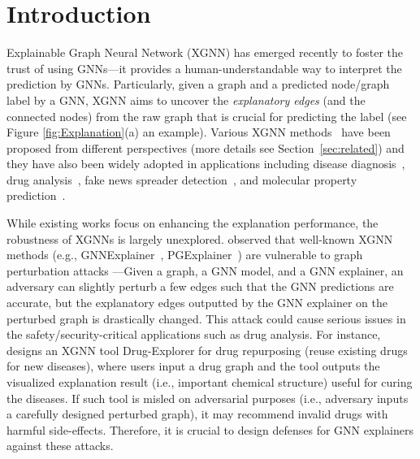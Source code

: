 \section{Introduction}
\label{sec:intro}

Explainable Graph Neural Network (XGNN) has emerged recently  to foster the trust of using GNNs---it provides a human-understandable way to interpret the prediction by GNNs. Particularly, given a graph and a predicted node/graph label by a GNN, XGNN aims to uncover the \emph{explanatory edges} (and the connected nodes) from the raw graph that is crucial for predicting the label (see Figure \ref{fig:Explanation}(a) an example). Various XGNN methods~\citep{GNNEx19,DBLP:journals/corr/abs-2011-04573/PGExplainer,DBLP:journals/corr/abs-2102-05152/subgraphX,zhang2022gstarx,wang2023/gnninterpreter,behnam2024graph} have been proposed from different perspectives (more details see Section~\ref{sec:related}) and they have also been widely adopted in applications including  disease diagnosis~\citep{pfeifer2022gnn}, drug analysis~\citep{yang2022mgraphdta,Drug_repurposing2023}, fake news spreader detection~\citep{rath2021scarlet}, and molecular property prediction~\cite{wu2023chemistry}. 
 
While existing works focus on enhancing the explanation performance, the robustness of XGNNs is largely unexplored. 
\citet{li2024graph} observed that  
 well-known XGNN methods (e.g., GNNExplainer~\citep{GNNEx19}, PGExplainer~\citep{DBLP:journals/corr/abs-2011-04573/PGExplainer}) are vulnerable to graph perturbation attacks
---Given a graph, a  GNN model, and a GNN explainer, an adversary can slightly perturb a few edges such that the GNN predictions are accurate, but the explanatory edges outputted by the GNN explainer on the perturbed graph is drastically changed. This attack could cause serious issues in the safety/security-critical applications such as drug analysis. For instance, \cite{Drug_repurposing2023} designs an XGNN tool Drug-Explorer for drug repurposing (reuse existing drugs for new diseases), where users input a drug graph and the tool outputs the visualized explanation result (i.e., important chemical structure) useful for curing the diseases. 
If such tool is misled on adversarial purposes (i.e., adversary inputs a carefully designed perturbed graph), it may recommend invalid drugs with harmful side-effects. Therefore, it is crucial to design defenses for GNN explainers against these attacks.


